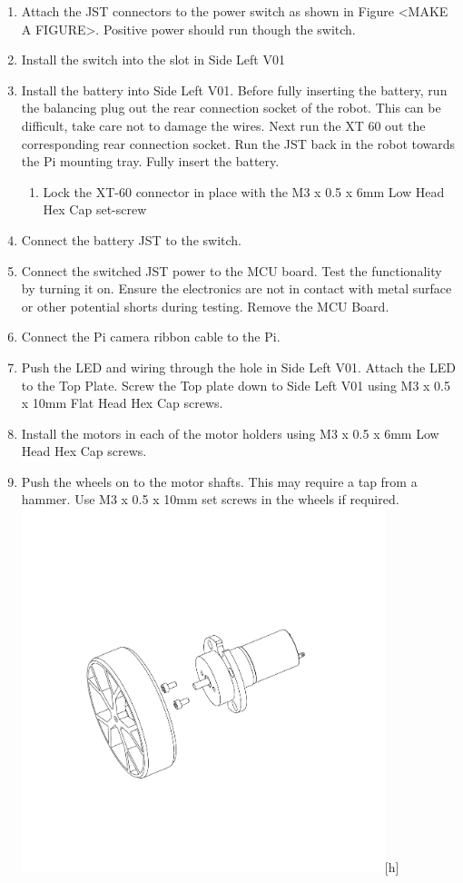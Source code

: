 \documentclass[12pt,titlepage,oneside]{memoir}
\begin{document}
\begin{enumerate}
\item  Attach the JST connectors to the power switch as shown in Figure <MAKE A FIGURE>. Positive power should run though the switch.
\item Install the switch into the slot in Side Left V01
\item Install the battery into Side Left V01. Before fully inserting the battery, run the balancing plug out the rear connection socket of the robot. This can be difficult, take care not to damage the wires. Next run the XT 60 out the corresponding rear connection socket. Run the JST back in the robot towards the Pi mounting tray. Fully insert the battery.
\begin{enumerate}
	\item Lock the XT-60 connector in place with the M3 x 0.5 x 6mm Low Head Hex Cap set-screw
\end{enumerate}
\item Connect the battery JST to the switch.
\item Connect the switched JST power to the MCU board. Test the functionality by turning it on. Ensure the electronics are not in contact with metal surface or other potential shorts during testing. Remove the MCU Board. 
\item Connect the Pi camera ribbon cable to the Pi.
\item Push the LED and wiring through the hole in Side Left V01. Attach the LED to the Top Plate. Screw the Top plate down to Side Left V01 using M3 x 0.5 x 10mm Flat Head Hex Cap screws.\\
\item Install the motors in each of the motor holders using M3 x 0.5 x 6mm Low Head Hex Cap screws.
\item Push the wheels on to the motor shafts. This may require a tap from a hammer. Use M3 x 0.5 x 10mm set screws in the wheels if required.
\includegraphics[width=400px]{assem/step3.PDF}[h]

\end{enumerate}
\end{document}
